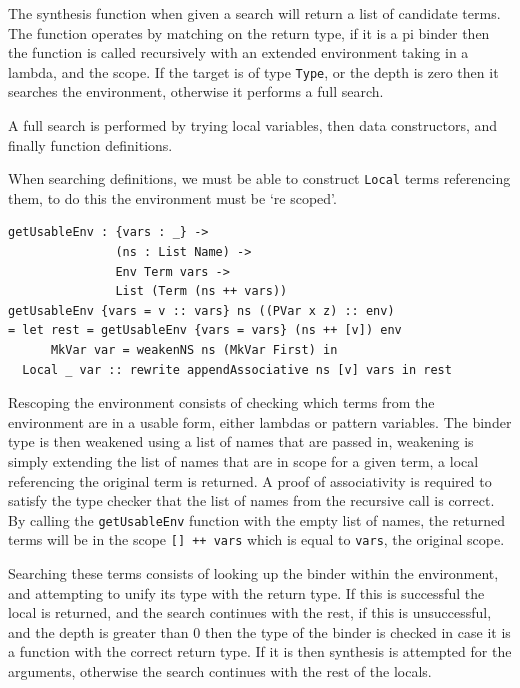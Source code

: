 \documentclass[a4paper]{article}
\begin{document}
The synthesis function when given a search will return a list of
candidate terms. The function operates by matching on the return
type, if it is a pi binder then the function is called recursively
with an extended environment taking in a lambda, and the scope. If the
target is of type \texttt{Type}, or the depth is zero then it searches the environment,
otherwise it performs a full search.

A full search is performed by trying local variables, then data constructors,
and finally function definitions. 

When searching definitions, we must be able to construct \texttt{Local} terms
referencing them, to do this the environment must be `re scoped'.

\begin{center}
  \begin{verbatim}
getUsableEnv : {vars : _} -> 
               (ns : List Name) ->
               Env Term vars ->
               List (Term (ns ++ vars))
getUsableEnv {vars = v :: vars} ns ((PVar x z) :: env) 
= let rest = getUsableEnv {vars = vars} (ns ++ [v]) env 
      MkVar var = weakenNS ns (MkVar First) in 
  Local _ var :: rewrite appendAssociative ns [v] vars in rest
  \end{verbatim}
\end{center}

Rescoping the environment consists of checking which terms from the 
environment are in a usable form, either lambdas or pattern variables.
The binder type is then weakened using a list of names that are passed in,
weakening is simply extending the list of names that are in scope for
a given term, a local referencing the original term is returned. A
proof of associativity is required to satisfy the type checker that
the list of names from the recursive call is correct. By calling
the \texttt{getUsableEnv} function with the empty list of names, the returned
terms will be in the scope \texttt{[] ++ vars} which is equal to
\texttt{vars}, the original scope.

Searching these terms consists of looking up the binder within the
environment, and attempting to unify its type with the return type.
If this is successful the local is returned, and the search continues
with the rest, if this is unsuccessful, and the depth is greater than
0 then the type of the binder is checked in case it is a function with
the correct return type. If it is then synthesis is attempted for the arguments,
otherwise the search continues with the rest of the locals.
\end{document}
